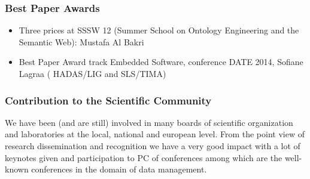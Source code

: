 
\subsubsection*{Best Paper Awards}
\begin{itemize}

\item Three prices at SSSW 12 (Summer School on Ontology Engineering and the Semantic Web): Mustafa Al Bakri  

\item Best Paper Award track Embedded Software, conference DATE 2014, Sofiane Lagraa ( HADAS/LIG and SLS/TIMA) 

\end{itemize}




\subsubsection{Contribution to the Scientific Community}

We have been (and are still) involved in many boards of scientific organization and laboratories at the local, national and european level. From the point view of research dissemination and recognition we have a very good impact with a lot of keynotes  given and participation to PC of conferences among which are the well-known conferences in the domain of data management.
 
